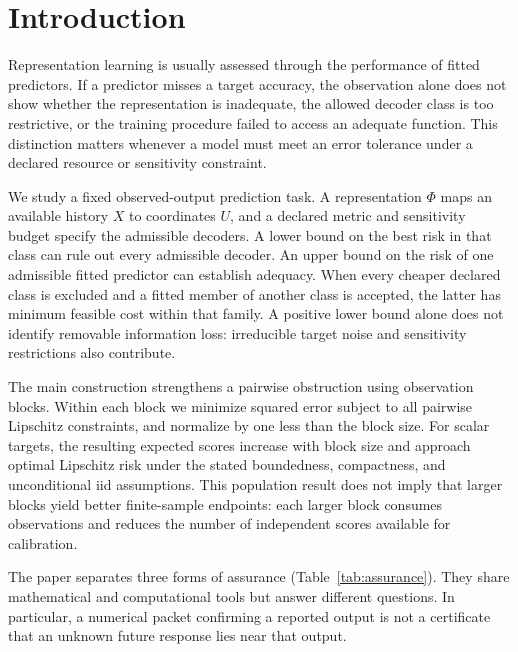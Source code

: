 \section{Introduction}
\label{sec:introduction}
Representation learning is usually assessed through the performance of fitted predictors. If a predictor misses a target accuracy, the observation alone does not show whether the representation is inadequate, the allowed decoder class is too restrictive, or the training procedure failed to access an adequate function. This distinction matters whenever a model must meet an error tolerance under a declared resource or sensitivity constraint.

We study a fixed observed-output prediction task. A representation $\Phi$ maps an available history $X$ to coordinates $U$, and a declared metric and sensitivity budget specify the admissible decoders. A lower bound on the best risk in that class can rule out every admissible decoder. An upper bound on the risk of one admissible fitted predictor can establish adequacy. When every cheaper declared class is excluded and a fitted member of another class is accepted, the latter has minimum feasible cost within that family. A positive lower bound alone does not identify removable information loss: irreducible target noise and sensitivity restrictions also contribute.

The main construction strengthens a pairwise obstruction using observation blocks. Within each block we minimize squared error subject to all pairwise Lipschitz constraints, and normalize by one less than the block size. For scalar targets, the resulting expected scores increase with block size and approach optimal Lipschitz risk under the stated boundedness, compactness, and unconditional iid assumptions. This population result does not imply that larger blocks yield better finite-sample endpoints: each larger block consumes observations and reduces the number of independent scores available for calibration.

The paper separates three forms of assurance (Table~\ref{tab:assurance}). They share mathematical and computational tools but answer different questions. In particular, a numerical packet confirming a reported output is not a certificate that an unknown future response lies near that output.

